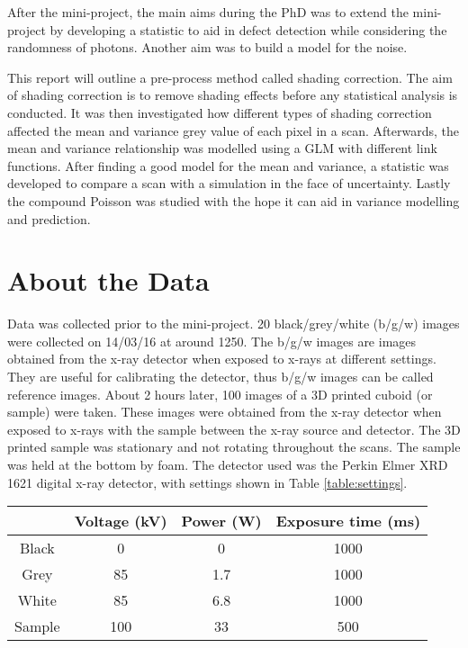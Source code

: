 \documentclass[a4paper]{proc}
\begin{document}
After the mini-project, the main aims during the PhD was to extend the mini-project by developing a statistic to aid in defect detection while considering the randomness of photons. Another aim was to build a model for the noise.

This report will outline a pre-process method called shading correction. The aim of shading correction is to remove shading effects before any statistical analysis is conducted. It was then investigated how different types of shading correction affected the mean and variance grey value of each pixel in a scan. Afterwards, the mean and variance relationship was modelled using a GLM with different link functions. After finding a good model for the mean and variance, a statistic was developed to compare a scan with a simulation in the face of uncertainty. Lastly the compound Poisson was studied with the hope it can aid in variance modelling and prediction.

\section{About the Data}
Data was collected prior to the mini-project. 20 black/grey/white (b/g/w) images were collected on 14/03/16 at around 1250. The b/g/w images are images obtained from the x-ray detector when exposed to x-rays at different settings. They are useful for calibrating the detector, thus b/g/w images can be called reference images. About 2 hours later, 100 images of a 3D printed cuboid (or sample) were taken. These images were obtained from the x-ray detector when exposed to x-rays with the sample between the x-ray source and detector. The 3D printed sample was stationary and not rotating throughout the scans. The sample was held at the bottom by foam. The detector used was the Perkin Elmer XRD 1621 digital x-ray detector, with settings shown in Table \ref{table:settings}.

\begin{table*}
	\centering
	\begin{tabular}{c|c|c|c}
		& Voltage (kV) & Power (W) & Exposure time (ms) \\
		\hline
		Black & 0 & 0 & 1000\\
		Grey & 85 & 1.7 & 1000\\
		White & 85 & 6.8 & 1000 \\
		Sample & 100 & 33 & 500
	\end{tabular}
	\caption{Setting of the x-ray CT scan when collecting images from the x-ray detector. Error bars were not given and the number of significant figures shown are as given.}
	\label{table:settings}
\end{table*}
\end{document}
